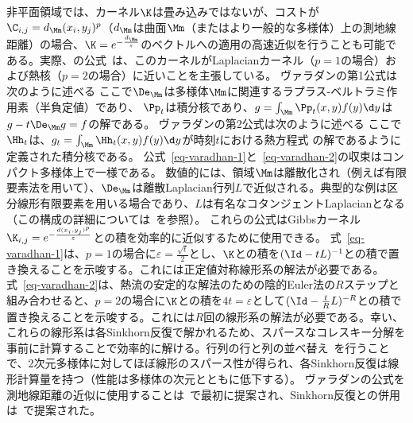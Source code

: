 \begin{rem}[熱近似における測地線]\label{rem-geod-heat}
非平面領域では、カーネル$\K$は畳み込みではないが、コストが$\C_{i,j}=d_\Mm(x_i,y_j)^p$（$d_\Mm$は曲面$\Mm$（またはより一般的な多様体）上の測地線距離）の場合、$\K=e^{-\frac{d_\Mm}{\varepsilon}}$のベクトルへの適用の高速近似を行うことも可能である。実際、\citeauthor{varadhan-1967}の公式~\citeyearpar{varadhan-1967}は、このカーネルがLaplacianカーネル（$p=1$の場合）および熱核（$p=2$の場合）に近いことを主張している。
%
ヴァラダンの第1公式は次のように述べる
ここで$\De_{\Mm}$は多様体$\Mm$に関連するラプラス-ベルトラミ作用素（半負定値）であり、
$\Pp_t$は積分核であり、$g = \int_\Mm \Pp_t(x,y) f(y) \d y$は$g - t \De_{\Mm} g = f$の解である。
%
ヴァラダンの第2公式は次のように述べる
ここで$\Hh_t$は、$g_t = \int_\Mm \Hh_t(x,y) f(y) \d y$が時刻$t$における熱方程式
の解であるように定義された積分核である。
公式~\eqref{eq-varadhan-1}と~\eqref{eq-varadhan-2}の収束はコンパクト多様体上で一様である。
%
数値的には、領域$\Mm$は離散化され（例えば有限要素法を用いて）、$\De_\Mm$は離散Laplacian行列$L$で近似される。典型的な例は区分線形有限要素を用いる場合であり、$L$は有名なコタンジェントLaplacianとなる（この構成の詳細については~\citep{botsch-2010}を参照）。
%
これらの公式はGibbsカーネル$\K_{i,j}=e^{-\frac{d(x_i,y_j)^p}{\varepsilon}}$との積を効率的に近似するために使用できる。
%
式~\eqref{eq-varadhan-1}は、$p=1$の場合に$\varepsilon=\frac{\sqrt{t}}{2}$とし、$\K$との積を$(\Id-t L)^{-1}$との積で置き換えることを示唆する。これには正定値対称線形系の解法が必要である。
%
式~\eqref{eq-varadhan-2}は、熱流の安定的な解法のための陰的Euler法の$R$ステップと組み合わせると、$p=2$の場合に$\K$との積を$4 t=\varepsilon$として$(\Id-\frac{t}{R} L)^{-R}$との積で置き換えることを示唆する。これには$R$回の線形系の解法が必要である。幸い、これらの線形系は各Sinkhorn反復で解かれるため、スパースなコレスキー分解を事前に計算することで効率的に解ける。行列の行と列の並べ替え~\citep{george1989evolution}を行うことで、2次元多様体に対してほぼ線形のスパース性が得られ、各Sinkhorn反復は線形計算量を持つ（性能は多様体の次元とともに低下する）。
%
ヴァラダンの公式を測地線距離の近似に使用することは~\citep{Crane2013}で最初に提案され、Sinkhorn反復との併用は~\citep{2015-solomon-siggraph}で提案された。
%
\end{rem}


